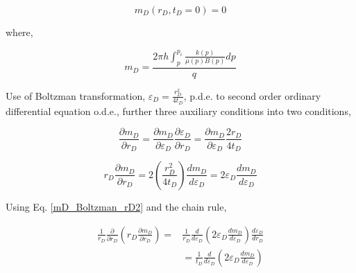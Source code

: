 \documentclass{llncs}
\numberwithin{equation}{section}
\numberwithin{figure}{section}
\numberwithin{table}{section}
\begin{document}
    \begin{equation}
        {{m}_{D}}\left( {{r}_{D}},{{t}_{D}}=0 \right)=0
        \label{Initial_Line_Source}
    \end{equation}

    where,

    \begin{equation}
        {{m}_{D}}=\frac{2\pi h\int_{p}^{{{p}_{i}}}{\frac{k\left( p \right)}{\mu \left( p \right)B\left( p \right)}dp}}{q}
        \label{mD_Line_Source}
    \end{equation}

    Use of Boltzman transformation, ${{\varepsilon }_{D}}=\frac{r_{D}^{2}}{4{{t}_{D}}}$,  p.d.e. to second order ordinary differential equation o.d.e., further  three auxiliary conditions into two conditions,

    \begin{equation}
        \frac{\partial {{m}_{D}}}{\partial {{r}_{D}}}=\frac{\partial {{m}_{D}}}{\partial {{\varepsilon }_{D}}}\frac{\partial {{\varepsilon }_{D}}}{\partial {{r}_{D}}}=\frac{\partial {{m}_{D}}}{\partial {{\varepsilon }_{D}}}\frac{2{{r}_{D}}}{4{{t}_{D}}}
        \label{mD_Boltzman_rD1}
    \end{equation}


    \begin{equation}
        {{r}_{D}}\frac{\partial {{m}_{D}}}{\partial {{r}_{D}}}=2\left( \frac{r_{D}^{2}}{4{{t}_{D}}} \right)\frac{d{{m}_{D}}}{d{{\varepsilon }_{D}}}=2{{\varepsilon }_{D}}\frac{d{{m}_{D}}}{d{{\varepsilon }_{D}}}
        \label{mD_Boltzman_rD2}
    \end{equation}

    Using Eq. \ref{mD_Boltzman_rD2} and the chain rule,

        \begin{equation}
        \begin{split}
         \frac{1}{{{r}_{D}}}\frac{\partial }{\partial {{r}_{D}}}\left( {{r}_{D}}\frac{\partial {{m}_{D}}}{\partial {{r}_{D}}} \right)=&\frac{1}{{{r}_{D}}}\frac{d}{d{{\varepsilon }_{D}}}\left( 2{{\varepsilon }_{D}}\frac{d{{m}_{D}}}{d{{\varepsilon }_{D}}} \right)\frac{d{{\varepsilon }_{D}}}{d{{r}_{D}}} \\
        & =\frac{1}{{{t}_{D}}}\frac{d}{d{{\varepsilon }_{D}}}\left( 2{{\varepsilon }_{D}}\frac{d{{m}_{D}}}{d{{\varepsilon }_{D}}} \right) \\
        \end{split}
        \label{mD_Boltzman_rD3}
    \end{equation}
\end{document}
